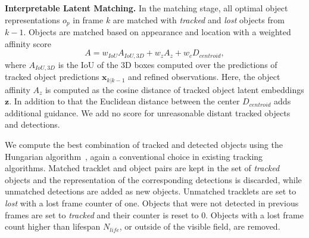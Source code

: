 
\vspace{0.5\baselineskip} \noindent \textbf{Interpretable Latent Matching.}
%
In the matching stage, all optimal object representations $o_p$ in frame $k$ are matched with \emph{tracked} and \emph{lost} objects from $k-1$. Objects are matched based on appearance and location with a weighted affinity score
\begin{equation}\label{eq:affinity}
    A = w_{IoU} A_{IoU,3D} + w_{z} A_{z} + w_{c} D_{centroid},
\end{equation}
where $A_{IoU,3D}$ is the IoU of the 3D boxes computed over the predictions of tracked object predictions $\mathbf{x}_{k|k-1}$ and refined observations. Here, the object affinity $A_{z}$ is computed as the cosine distance of tracked object latent embeddings $\mathbf{z}$. In addition to that the Euclidean distance between the center $D_{centroid}$ adds additional guidance. We add no score for unreasonable distant tracked objects and detections.

We compute the best combination of tracked and detected objects using the Hungarian algorithm~\cite{kuhn1955hungarian}, again a conventional choice in existing tracking algorithms. Matched tracklet and object pairs are kept in the set of \emph{tracked} objects and the representation of the corresponding detections is discarded, while unmatched detections are added as new objects.
Unmatched tracklets are set to \emph{lost} with a lost frame counter of one. Objects that were not detected in previous frames are set to \emph{tracked} and their counter is reset to $0$. Objects with a lost frame count higher than lifespan $N_{life}$, or outside of the visible field, are removed.


